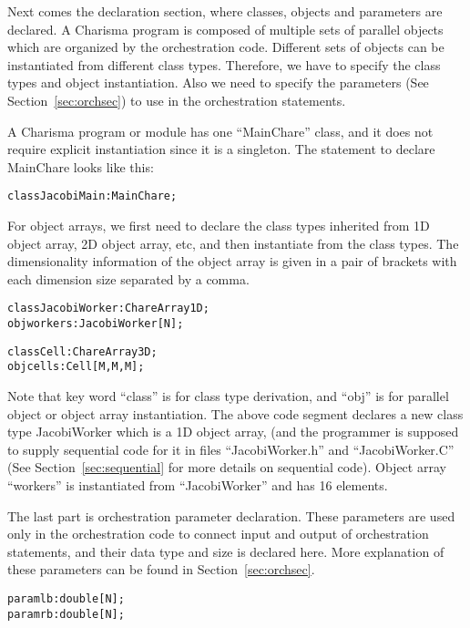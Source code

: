 Next comes the declaration section, where classes, objects and parameters are
declared. A Charisma program is composed of multiple sets of parallel objects
which are organized by the orchestration code. Different sets of objects can be
instantiated from different class types. Therefore, we have to specify the class
types and object instantiation. Also we need to specify the parameters (See
Section~\ref{sec:orchsec}) to use in the orchestration statements. 

A Charisma program or module has one ``MainChare'' class, and it does not
require explicit instantiation since it is a singleton. The statement to declare
MainChare looks like this:

\begin{alltt}
    class JacobiMain : MainChare;
\end{alltt}

For object arrays, we first need to declare the class types inherited from 1D
object array, 2D object array, etc, and then instantiate from the class types. 
The dimensionality information of the object array is given in a pair of 
brackets with each dimension size separated by a comma.

\begin{alltt}
    class JacobiWorker : ChareArray1D;
    obj workers : JacobiWorker[N];

    class Cell : ChareArray3D;
    obj cells : Cell[M,M,M];
\end{alltt}

Note that key word ``class'' is for class type derivation, and ``obj'' is for
parallel object or object array instantiation. The above code segment declares a
new class type JacobiWorker which is a 1D object array, (and the programmer is
supposed to supply sequential code for it in files ``JacobiWorker.h'' and
``JacobiWorker.C'' (See Section~\ref{sec:sequential} for more details on
sequential code). Object array ``workers'' is instantiated from ``JacobiWorker''
and has 16 elements.

The last part is orchestration parameter declaration. These parameters are used
only in the orchestration code to connect input and output of orchestration
statements, and their data type and size is declared here. More explanation of
these parameters can be found in Section~\ref{sec:orchsec}. 

\begin{alltt}
    param lb : double[N];
    param rb : double[N];
\end{alltt}

